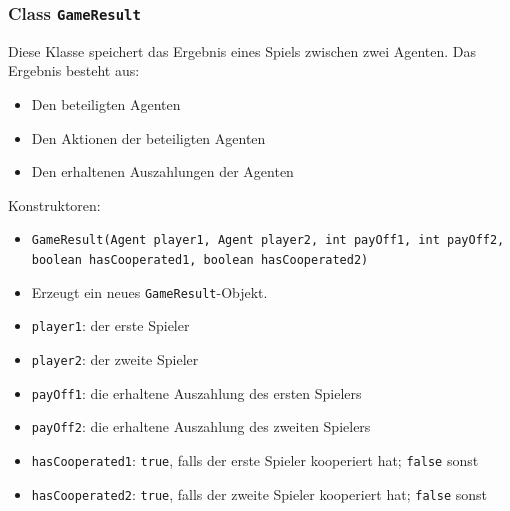\documentclass[parskip=full,11pt]{scrartcl}
\begin{document}
\subsubsection{Class \texttt{GameResult}}

Diese Klasse speichert das Ergebnis eines Spiels zwischen zwei Agenten. Das Ergebnis besteht aus:
\begin{itemize}\itemsep -10pt
	\item Den beteiligten Agenten
	\item Den Aktionen der beteiligten Agenten
	\item Den erhaltenen Auszahlungen der Agenten
\end{itemize}
	
Konstruktoren:
\begin{itemize}\itemsep -10pt
\item \texttt{GameResult(Agent player1, Agent player2, int payOff1, int payOff2, boolean hasCooperated1, boolean hasCooperated2)}
\item[] Erzeugt ein neues \texttt{GameResult}-Objekt.
\item[] \texttt{player1}: der erste Spieler
\item[] \texttt{player2}: der zweite Spieler
\item[] \texttt{payOff1}: die erhaltene Auszahlung des ersten Spielers
\item[] \texttt{payOff2}: die erhaltene Auszahlung des zweiten Spielers
\item[] \texttt{hasCooperated1}: \texttt{true}, falls der erste Spieler kooperiert hat; \texttt{false} sonst
\item[] \texttt{hasCooperated2}: \texttt{true}, falls der zweite Spieler kooperiert hat; \texttt{false} sonst
\end{itemize}
\end{document}
